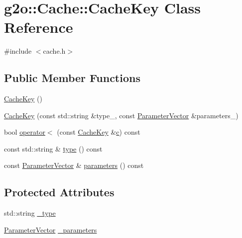 \hypertarget{classg2o_1_1Cache_1_1CacheKey}{}\section{g2o\+:\+:Cache\+:\+:Cache\+Key Class Reference}
\label{classg2o_1_1Cache_1_1CacheKey}


{\ttfamily \#include $<$cache.\+h$>$}

\subsection*{Public Member Functions}
\begin{DoxyCompactItemize}
\item 
\hyperlink{classg2o_1_1Cache_1_1CacheKey_a44405e660e962a9d39cfaf97f103b139}{Cache\+Key} ()
\item 
\hyperlink{classg2o_1_1Cache_1_1CacheKey_a363ba06fe3b3f17acd664b0706ba3270}{Cache\+Key} (const std\+::string \&type\+\_\+, const \hyperlink{namespaceg2o_a85cc8f2c7db8cab47b2b269a7acd6785}{Parameter\+Vector} \&parameters\+\_\+)
\item 
bool \hyperlink{classg2o_1_1Cache_1_1CacheKey_a4a6e782eeee8c5300abe0fd5a89ed6a8}{operator$<$} (const \hyperlink{classg2o_1_1Cache_1_1CacheKey}{Cache\+Key} \&\hyperlink{sparse__helper_8cpp_a4e1e0e72dd773439e333c84dd762a9c3}{c}) const 
\item 
const std\+::string \& \hyperlink{classg2o_1_1Cache_1_1CacheKey_aea8a503e67d00d2376a5435c1d05be99}{type} () const 
\item 
const \hyperlink{namespaceg2o_a85cc8f2c7db8cab47b2b269a7acd6785}{Parameter\+Vector} \& \hyperlink{classg2o_1_1Cache_1_1CacheKey_ac872928298c0b413e152efd04e22cda6}{parameters} () const 
\end{DoxyCompactItemize}
\subsection*{Protected Attributes}
\begin{DoxyCompactItemize}
\item 
std\+::string \hyperlink{classg2o_1_1Cache_1_1CacheKey_a886ec6cf583561cb791cbaff902c673d}{\+\_\+type}
\item 
\hyperlink{namespaceg2o_a85cc8f2c7db8cab47b2b269a7acd6785}{Parameter\+Vector} \hyperlink{classg2o_1_1Cache_1_1CacheKey_a3f8dc2307bd1d174a30bdc8443a8d152}{\+\_\+parameters}
\end{DoxyCompactItemize}
